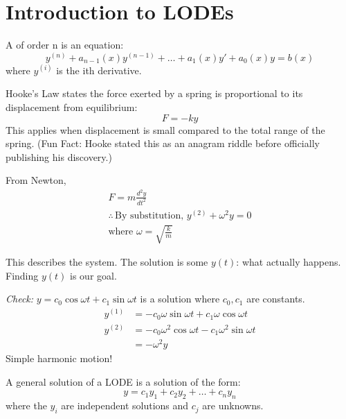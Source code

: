 \documentclass[../main.tex]{subfiles}
\begin{document}

\section{Introduction to LODEs}

\begin{definition}
    A  of order n is an equation:
    \[ y^{(n)}+a_{n-1}(x)y^{(n-1)}+\dots+a_{1}(x)y'+a_{0}(x)y=b(x)  \]
    where $y^{(i)}$ is the ith derivative.
\end{definition}

\begin{example}
    Hooke's Law states the force exerted by a spring is proportional to its displacement from equilibrium:
    \[ F = -ky \]
    This applies when displacement is small compared to the total range of the spring.
    (Fun Fact: Hooke stated this as an anagram riddle before officially publishing his discovery.)

    From Newton,
    \begin{gather*}
        F = m\frac{d^2y}{dt^2} \\
        \therefore \, \text{By substitution, } y^{(2)}+\omega^2y=0 \\
        \text{where } \omega =\sqrt{ \frac{k}{m} }
    \end{gather*}

    This describes the system. The solution is some \(y(t)\): what actually happens. Finding \(y(t)\) is our goal.

    \textit{Check:} \(y=c_{0}\cos \omega t+c_{1}\sin \omega t\) is a solution where \(c_{0},c_{1}\) are constants.
    \begin{align*}
        y^{(1)} & = -c_{0}\omega \sin \omega t+c_{1}\omega \cos \omega t \\
        y^{(2)} & = -c_{0}\omega^2\cos \omega t-c_{1}\omega^2\sin \omega t \\
        & = -\omega^2 y
    \end{align*}
    Simple harmonic motion!
\end{example}

\begin{definition}
    A general solution of a LODE is a solution of the form:
    \[ y = c_{1}y_{1}+c_{2}y_{2}+\dots+c_{n}y_{n} \]
    where the \(y_{i}\) are independent solutions and \(c_{j}\) are unknowns.
\end{definition}
\end{document}
